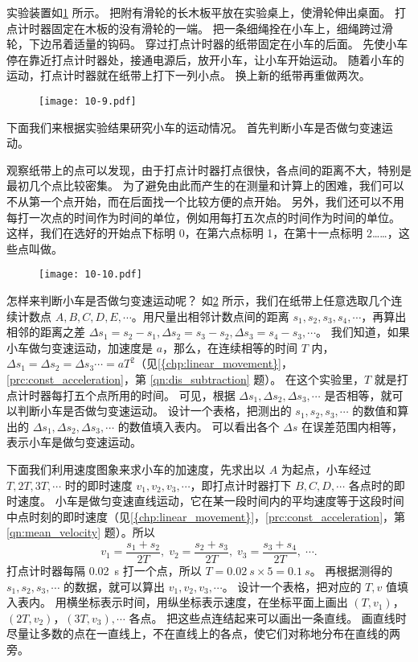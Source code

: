 实验装置如\cref{fig:10-9} 所示。
把附有滑轮的长木板平放在实验桌上，使滑轮伸出桌面。
打点计时器固定在木板的没有滑轮的一端。
把一条细绳拴在小车上，细绳跨过滑轮，下边吊着适量的钩码。
穿过打点计时器的纸带固定在小车的后面。
先使小车停在靠近打点计时器处，接通电源后，放开小车，让小车开始运动。
随着小车的运动，打点计时器就在纸带上打下一列小点。
换上新的纸带再重做两次。	
\begin{figure}
  \texttt{[image: 10-9.pdf]}
  \caption{}\label{fig:10-9}
\end{figure}

下面我们来根据实验结果研究小车的运动情况。
首先判断小车是否做匀变速运动。

观察纸带上的点可以发现，由于打点计时器打点很快，各点间的距离不大，特别是最初几个点比较密集。
为了避免由此而产生的在测量和计算上的困难，我们可以不从第一个点开始，而在后面找一个比较方便的点开始。
另外，我们还可以不用每打一次点的时间作为时间的单位，例如用每打五次点的时间作为时间的单位。
这样，我们在选好的开始点下标明 0，在第六点标明 1，在第十一点标明 2……，这些点叫做。

\begin{figure}
  \texttt{[image: 10-10.pdf]}
  \caption{}\label{fig:10-10}
\end{figure}

怎样来判断小车是否做匀变速运动呢？
如\cref{fig:10-10} 所示，我们在纸带上任意选取几个连续计数点 $A,B,C,D,E,\cdots$。用尺量出相邻计数点间的距离 $s_1,s_2,s_3,s_4,\cdots$，再算出相邻的距离之差 $\Delta s_1=s_2-s_1, \Delta s_2=s_3-s_2,\Delta s_3=s_4-s_3,\cdots$。
我们知道，如果小车做匀变速运动，加速度是 $a$，那么，在连续相等的时间 $T$ 内，$\Delta s_1=\Delta s_2=\Delta s_3\cdots=aT^2$（见\cref{{chp:linear_movement}}，\cref{prc:const_acceleration}，第 \ref{qn:dis_subtraction} 题）。
在这个实验里，$T$ 就是打点计时器每打五个点所用的时间。
可见，根据 $\Delta s_1,\Delta s_2,\Delta s_3,\cdots$ 是否相等，就可以判断小车是否做匀变速运动。
设计一个表格，把测出的 $s_1,s_2,s_3,\cdots$ 的数值和算出的 $\Delta s_1,\Delta s_2,\Delta s_3,\cdots$ 的数值填入表内。
可以看出各个 $\Delta s$ 在误差范围内相等，表示小车是做匀变速运动。

下面我们利用速度图象来求小车的加速度，先求出以 $A$ 为起点，小车经过 $T,2T,3T,\cdots$ 时的即时速度 $v_1,v_2,v_3,\cdots$，即打点计时器打下 $B,C,D,\cdots$ 各点时的即时速度。
小车是做匀变速直线运动，它在某一段时间内的平均速度等于这段时间中点时刻的即时速度（见\cref{{chp:linear_movement}}，\cref{prc:const_acceleration}，第 \ref{qn:mean_velocity} 题）。所以
\[v_1=\frac{s_1+s_2}{2T},\; v_2=\frac{s_2+s_3}{2T},\;v_3=\frac{s_3+s_4}{2T},\; \cdots.\]
打点计时器每隔 \qty{0.02}{s} 打一个点，所以 $T=\qty{0.02}{s}\times 5=\qty{0.1}{s}$。
再根据测得的 $s_1,s_2,s_3,\cdots$ 的数据，就可以算出 $v_1,v_2,v_3,\cdots$。
设计一个表格，把对应的 $T,v$ 值填入表内。
用横坐标表示时间，用纵坐标表示速度，在坐标平面上画出 $(T,v_1)$，$(2T,v_2)$，$(3T,v_3),\cdots$ 各点。
把这些点连结起来可以画出一条直线。
画直线时尽量让多数的点在一直线上，不在直线上的各点，使它们对称地分布在直线的两旁。

